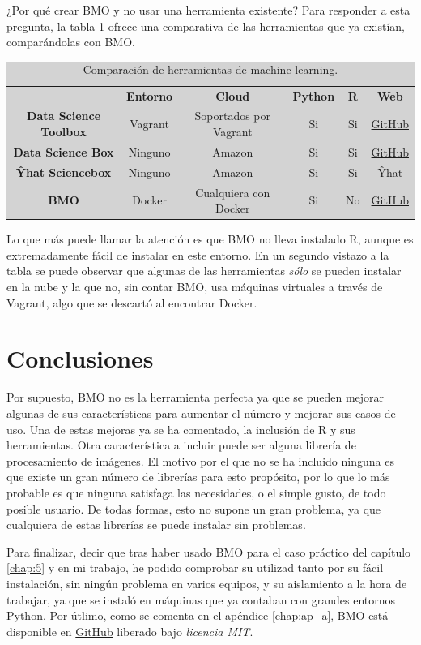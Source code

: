 ¿Por qué crear BMO y no usar una herramienta existente? Para responder a esta pregunta, la tabla \ref{table:4.1} ofrece una comparativa de las herramientas que ya existían, comparándolas con BMO.

\begin{table}[H]
\begin{adjustwidth}{-20mm}{-20mm}
\centering
\colorbox{lightgray}{\begin{tabular}{*{6}{c}}
  & \textbf{Entorno} & \textbf{Cloud} & \textbf{Python} & \textbf{R} & \textbf{Web} \\
  \textbf{Data Science Toolbox} & Vagrant & Soportados por Vagrant & Si & Si & \href{https://github.com/DataScienceToolbox/data-science-toolbox/}{GitHub} \\
  \textbf{Data Science Box} & Ninguno & Amazon & Si & Si & \href{https://github.com/drewconway/data_science_box}{GitHub} \\
  \textbf{Ŷhat Sciencebox} & Ninguno & Amazon & Si & Si & \href{https://github.com/drewconway/data_science_box}{Ŷhat} \\
  \textbf{BMO} & Docker & Cualquiera con Docker & Si & No & \href{https://github.com/josemazo/bmo}{GitHub}
\end{tabular}}
\caption{Comparación de herramientas de machine learning.}
\label{table:4.1}
\end{adjustwidth}
\end{table}

Lo que más puede llamar la atención es que BMO no lleva instalado R, aunque es extremadamente fácil de instalar en este entorno. En un segundo vistazo a la tabla se puede observar que algunas de las herramientas \emph{sólo} se pueden instalar en la nube y la que no, sin contar BMO, usa máquinas virtuales a través de Vagrant, algo que se descartó al encontrar Docker.

\section{Conclusiones} \label{sec:4.6}

Por supuesto, BMO no es la herramienta perfecta ya que se pueden mejorar algunas de sus características para aumentar el número y mejorar sus casos de uso. Una de estas mejoras ya se ha comentado, la inclusión de R y sus herramientas. Otra característica a incluir puede ser alguna librería de procesamiento de imágenes. El motivo por el que no se ha incluido ninguna es que existe un gran número de librerías para esto propósito, por lo que lo más probable es que ninguna satisfaga las necesidades, o el simple gusto, de todo posible usuario. De todas formas, esto no supone un gran problema, ya que cualquiera de estas librerías se puede instalar sin problemas.

Para finalizar, decir que tras haber usado BMO para el caso práctico del capítulo \ref{chap:5} y en mi trabajo, he podido comprobar su utilizad tanto por su fácil instalación, sin ningún problema en varios equipos, y su aislamiento a la hora de trabajar, ya que se instaló en máquinas que ya contaban con grandes entornos Python. Por útlimo, como se comenta en el apéndice \ref{chap:ap_a}, BMO está disponible en \href{https://github.com/josemazo/bmo}{GitHub} liberado bajo \emph{licencia MIT}.
